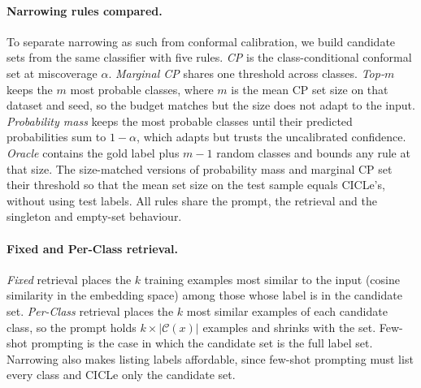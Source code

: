 \paragraph{Narrowing rules compared.}\label{sec:rules}
To separate narrowing as such from conformal calibration, we build candidate sets from the same classifier with five rules.
\emph{CP} is the class-conditional conformal set at miscoverage $\alpha$.
\emph{Marginal CP} shares one threshold across classes.
\emph{Top-$m$} keeps the $m$ most probable classes, where $m$ is the mean CP set size on that dataset and seed, so the budget matches but the size does not adapt to the input.
\emph{Probability mass} keeps the most probable classes until their predicted probabilities sum to $1-\alpha$, which adapts but trusts the uncalibrated confidence.
\emph{Oracle} contains the gold label plus $m-1$ random classes and bounds any rule at that size.
The size-matched versions of probability mass and marginal CP set their threshold so that the mean set size on the test sample equals CICLe's, without using test labels.
All rules share the prompt, the retrieval and the singleton and empty-set behaviour.

\paragraph{Fixed and Per-Class retrieval.}
\emph{Fixed} retrieval places the $k$ training examples most similar to the input (cosine similarity in the embedding space) among those whose label is in the candidate set.
\emph{Per-Class} retrieval places the $k$ most similar examples of each candidate class, so the prompt holds $k \times |\mathcal{C}(x)|$ examples and shrinks with the set.
Few-shot prompting is the case in which the candidate set is the full label set.
Narrowing also makes listing labels affordable, since few-shot prompting must list every class and CICLe only the candidate set.
